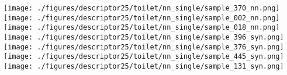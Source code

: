 \documentclass[10pt,twocolumn,letterpaper]{article}
\begin{document}
\begin{figure*}[h]
        \texttt{[image: ./figures/descriptor25/toilet/nn\_single/sample\_370\_nn.png]} \hspace{-3.5mm}   
       \texttt{[image: ./figures/descriptor25/toilet/nn\_single/sample\_002\_nn.png]}\hspace{-2.5mm}               
        \texttt{[image: ./figures/descriptor25/toilet/nn\_single/sample\_018\_nn.png]}         \hspace{-2.5mm}  
       \texttt{[image: ./figures/descriptor25/toilet/nn\_single/sample\_396\_syn.png]}          \hspace{-2.5mm}   
     \texttt{[image: ./figures/descriptor25/toilet/nn\_single/sample\_376\_syn.png]}          \hspace{-2.5mm}   
      \texttt{[image: ./figures/descriptor25/toilet/nn\_single/sample\_445\_syn.png]}          \hspace{-2.5mm}   
     \texttt{[image: ./figures/descriptor25/toilet/nn\_single/sample\_131\_syn.png]}          \hspace{-3.5mm}   

\end{figure*}
\end{document}
